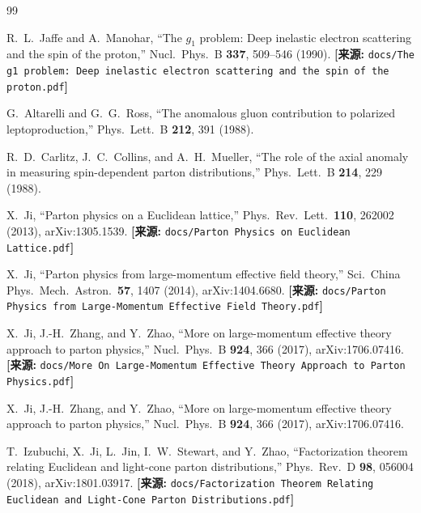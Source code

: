\documentclass[12pt,a4paper]{ctexart}
\theoremstyle{definition}
\begin{document}
\begin{thebibliography}{99}


R.~L.~Jaffe and A.~Manohar,
``The $g_1$ problem: Deep inelastic electron scattering and the spin of the proton,''
Nucl.\ Phys.\ B \textbf{337}, 509--546 (1990).
\quad\textbf{[来源:} \texttt{docs/The g1 problem: Deep inelastic electron scattering and the spin of the proton.pdf}\textbf{]}

G.~Altarelli and G.~G.~Ross,
``The anomalous gluon contribution to polarized leptoproduction,''
Phys.\ Lett.\ B \textbf{212}, 391 (1988).

R.~D.~Carlitz, J.~C.~Collins, and A.~H.~Mueller,
``The role of the axial anomaly in measuring spin-dependent parton distributions,''
Phys.\ Lett.\ B \textbf{214}, 229 (1988).


X.~Ji,
``Parton physics on a Euclidean lattice,''
Phys.\ Rev.\ Lett.\ \textbf{110}, 262002 (2013), arXiv:1305.1539.
\quad\textbf{[来源:} \texttt{docs/Parton Physics on Euclidean Lattice.pdf}\textbf{]}

X.~Ji,
``Parton physics from large-momentum effective field theory,''
Sci.\ China Phys.\ Mech.\ Astron.\ \textbf{57}, 1407 (2014), arXiv:1404.6680.
\quad\textbf{[来源:} \texttt{docs/Parton Physics from Large-Momentum Effective Field Theory.pdf}\textbf{]}

X.~Ji, J.-H.~Zhang, and Y.~Zhao,
``More on large-momentum effective theory approach to parton physics,''
Nucl.\ Phys.\ B \textbf{924}, 366 (2017), arXiv:1706.07416.
\quad\textbf{[来源:} \texttt{docs/More On Large-Momentum Effective Theory Approach to Parton Physics.pdf}\textbf{]}

X.~Ji, J.-H.~Zhang, and Y.~Zhao,
``More on large-momentum effective theory approach to parton physics,''
Nucl.\ Phys.\ B \textbf{924}, 366 (2017), arXiv:1706.07416.

T.~Izubuchi, X.~Ji, L.~Jin, I.~W.~Stewart, and Y.~Zhao,
``Factorization theorem relating Euclidean and light-cone parton distributions,''
Phys.\ Rev.\ D \textbf{98}, 056004 (2018), arXiv:1801.03917.
\quad\textbf{[来源:} \texttt{docs/Factorization Theorem Relating Euclidean and Light-Cone Parton Distributions.pdf}\textbf{]}



\end{thebibliography}
\end{document}
